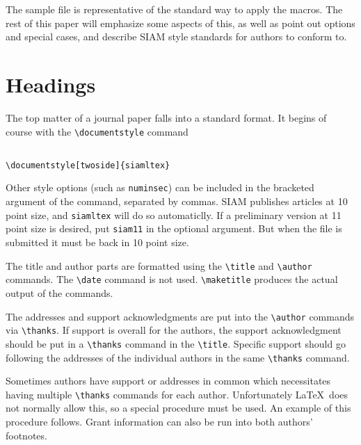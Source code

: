 The sample file is representative of the standard way to
apply the macros. The rest of this paper will emphasize
some aspects of this, as well as point out options and
special cases, and describe SIAM style standards for
authors to conform to.


\section{Headings}
The top matter of a journal paper falls into a standard
format. It begins of course with the \verb|\documentstyle| command

\begin{verbatim}

\documentstyle[twoside]{siamltex}

\end{verbatim}

Other style options (such as {\tt numinsec}) can be included
in the bracketed argument of the command, separated by commas.
SIAM publishes articles at 10 point size, and {\tt siamltex}
will do so automaticlly. If a preliminary version
at 11 point size is desired, put {\tt siam11} in the optional
argument. But when the file is submitted it must be back in
10 point size.

The title and author parts are formatted using the
\verb|\title| and \verb|\author| commands. The \verb|\date|
command is not used. \verb|\maketitle| produces the actual
output of the commands.

The addresses and support acknowledgments are put into the
\verb|\author| commands via \verb|\thanks|. If support is
overall for the authors, the support acknowledgment should
be put in a \verb|\thanks| command in the \verb|\title|.
Specific support should go following the addresses of the
individual authors in the same \verb|\thanks| command.

Sometimes authors have support or addresses in common which
necessitates having multiple \verb|\thanks| commands for
each author. Unfortunately \LaTeX\ does not normally allow this, 
so a special procedure must be used. An example of this procedure
follows. Grant information can also be run into both authors' 
footnotes.

